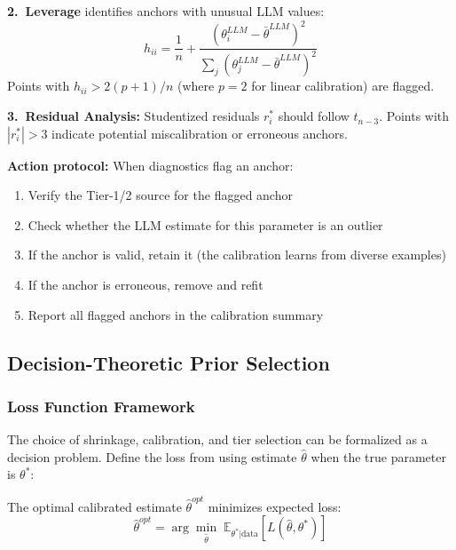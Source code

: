 \textbf{2.\ Leverage} identifies anchors with unusual LLM values:
\begin{equation}
    h_{ii} = \frac{1}{n} + \frac{(\theta^{LLM}_i - \bar{\theta}^{LLM})^2}
    {\sum_j (\theta^{LLM}_j - \bar{\theta}^{LLM})^2}
    \label{eq:leverage}
\end{equation}
Points with $h_{ii} > 2(p+1)/n$ (where $p=2$ for linear calibration) are flagged.

\textbf{3.\ Residual Analysis:} Studentized residuals $r_i^*$ should follow $t_{n-3}$.
Points with $|r_i^*| > 3$ indicate potential miscalibration or erroneous anchors.

\textbf{Action protocol:} When diagnostics flag an anchor:
\begin{enumerate}[nosep]
    \item Verify the Tier-1/2 source for the flagged anchor
    \item Check whether the LLM estimate for this parameter is an outlier
    \item If the anchor is valid, retain it (the calibration learns from diverse examples)
    \item If the anchor is erroneous, remove and refit
    \item Report all flagged anchors in the calibration summary
\end{enumerate}


\subsection{Decision-Theoretic Prior Selection}
\label{sec:AN-decision-theory}

\subsubsection{Loss Function Framework}
\label{sec:AN-loss}

The choice of shrinkage, calibration, and tier selection can be formalized as a
decision problem. Define the loss from using estimate $\hat{\theta}$ when the true
parameter is $\theta^*$:

\begin{axiom}
\label{ax:AN-A6}
The optimal calibrated estimate $\hat{\theta}^{opt}$ minimizes expected loss:
\begin{equation}
    \hat{\theta}^{opt} = \arg\min_{\hat{\theta}} \;
    \mathbb{E}_{\theta^* | \text{data}} \left[ L(\hat{\theta}, \theta^*) \right]
    \label{eq:optimal-estimate}
\end{equation}
\end{axiom}

